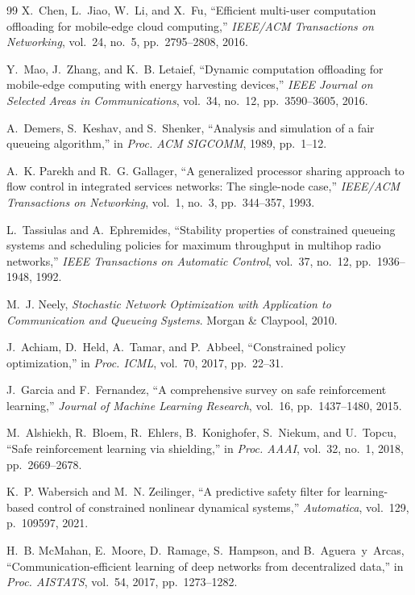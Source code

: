 \documentclass[10pt,journal]{IEEEtran}
\begin{document}
\begin{thebibliography}{99}
X.~Chen, L.~Jiao, W.~Li, and X.~Fu, ``Efficient multi-user computation offloading for mobile-edge cloud computing,'' \emph{IEEE/ACM Transactions on Networking}, vol.~24, no.~5, pp.~2795--2808, 2016.

Y.~Mao, J.~Zhang, and K.~B. Letaief, ``Dynamic computation offloading for mobile-edge computing with energy harvesting devices,'' \emph{IEEE Journal on Selected Areas in Communications}, vol.~34, no.~12, pp.~3590--3605, 2016.

A.~Demers, S.~Keshav, and S.~Shenker, ``Analysis and simulation of a fair queueing algorithm,'' in \emph{Proc. ACM SIGCOMM}, 1989, pp.~1--12.

A.~K. Parekh and R.~G. Gallager, ``A generalized processor sharing approach to flow control in integrated services networks: The single-node case,'' \emph{IEEE/ACM Transactions on Networking}, vol.~1, no.~3, pp.~344--357, 1993.

L.~Tassiulas and A.~Ephremides, ``Stability properties of constrained queueing systems and scheduling policies for maximum throughput in multihop radio networks,'' \emph{IEEE Transactions on Automatic Control}, vol.~37, no.~12, pp.~1936--1948, 1992.

M.~J. Neely, \emph{Stochastic Network Optimization with Application to Communication and Queueing Systems}. Morgan \& Claypool, 2010.

J.~Achiam, D.~Held, A.~Tamar, and P.~Abbeel, ``Constrained policy optimization,'' in \emph{Proc. ICML}, vol.~70, 2017, pp.~22--31.

J.~Garcia and F.~Fernandez, ``A comprehensive survey on safe reinforcement learning,'' \emph{Journal of Machine Learning Research}, vol.~16, pp.~1437--1480, 2015.

M.~Alshiekh, R.~Bloem, R.~Ehlers, B.~Konighofer, S.~Niekum, and U.~Topcu, ``Safe reinforcement learning via shielding,'' in \emph{Proc. AAAI}, vol.~32, no.~1, 2018, pp.~2669--2678.

K.~P. Wabersich and M.~N. Zeilinger, ``A predictive safety filter for learning-based control of constrained nonlinear dynamical systems,'' \emph{Automatica}, vol.~129, p.~109597, 2021.

H.~B. McMahan, E.~Moore, D.~Ramage, S.~Hampson, and B.~Aguera~y~Arcas, ``Communication-efficient learning of deep networks from decentralized data,'' in \emph{Proc. AISTATS}, vol.~54, 2017, pp.~1273--1282.


\end{thebibliography}
\end{document}
